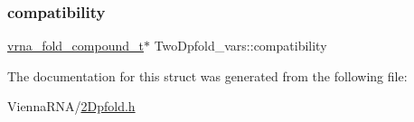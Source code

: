 \mbox{\label{struct_two_dpfold__vars_a159ec125caf5c33f5c19dbeeed54c047}} 
\subsubsection{\texorpdfstring{compatibility}{compatibility}}
{\footnotesize\ttfamily \mbox{\hyperlink{group__fold__compound_ga1b0cef17fd40466cef5968eaeeff6166}{vrna\+\_\+fold\+\_\+compound\+\_\+t}}$\ast$ Two\+Dpfold\+\_\+vars\+::compatibility}



The documentation for this struct was generated from the following file\+:\begin{DoxyCompactItemize}
\item 
Vienna\+R\+N\+A/\mbox{\hyperlink{2_dpfold_8h}{2\+Dpfold.\+h}}\end{DoxyCompactItemize}

